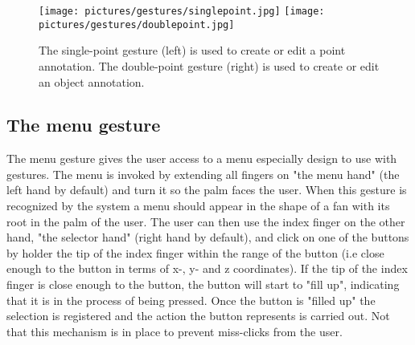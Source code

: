 \begin{figure}%
	\texttt{[image: pictures/gestures/singlepoint.jpg]}
    \texttt{[image: pictures/gestures/doublepoint.jpg]}
	\caption[The single-point and double-point gestures]{The single-point gesture (left) is used to create or edit a point annotation. 
             The double-point gesture (right) is used to create or edit an object annotation.}
	\label{fig:gestures3}
\end{figure} 

\subsection{The menu gesture}
The menu gesture gives the user access to a menu especially design to use with gestures. The menu is invoked by extending all fingers on 
"the menu hand" (the left hand by default) and turn it so the palm faces the user. When this gesture is recognized by the system a menu should 
appear in the shape of a fan with its root in the palm of the user. The user can then use the index finger on the other hand, "the selector hand" (right hand by default),
and click on one of the buttons by holder the tip of the index finger within the range of the button (i.e close enough to the button in terms of x-, y- and z coordinates).
If the tip of the index finger is close enough to the button, the button will start to "fill up", indicating that it is in the process of being pressed.
Once the button is "filled up" the selection is registered and the action the button represents is carried out. Not that this mechanism is in place
to prevent miss-clicks from the user.